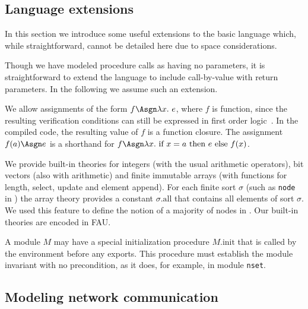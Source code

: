
\subsection{Language extensions}
\label{sec:extensions}

In this section we introduce some useful extensions to the basic
language which, while straightforward, cannot be detailed here due to
space considerations.

Though we have modeled procedure calls as having no parameters, it is
straightforward to extend the language to include call-by-value with
return parameters. In the following we assume such an extension.

We allow assignments of the form $f \Asgn \lambda x.\ e$, where $f$ is
function, since the resulting verification conditions can still be
expressed in first order logic~\cite{Ivy}. In the compiled code, the
resulting value of $f$ is a function closure.  The assignment $f(a)
\Asgn e$ is a shorthand for $f \Asgn \lambda x.\ \mbox{if $x=a$ then
  $e$ else $f(x)$}$.

We provide built-in theories for integers (with the usual arithmetic
operators), bit vectors (also with arithmetic) and finite immutable
arrays (with functions for length, select, update and element
append). For each finite sort $\sigma$ (such as {\tt node} in \Toy)
the array theory provides a constant $\sigma.\mbox{all}$ that contains
all elements of sort $\sigma$. We used this feature to define the
notion of a majority of nodes in \Toy. Our built-in theories are
encoded in FAU.  

A module $M$ may have a special initialization procedure
$M.\mbox{init}$ that is called by the environment before any
exports. This procedure must establish the module invariant with no
precondition, as it does, for example, in module \texttt{nset}.

\subsection{Modeling network communication}

